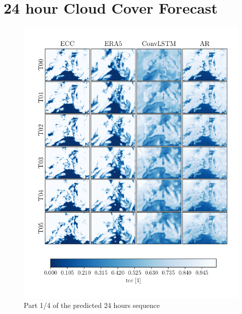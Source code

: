 \cleardoublepage
\chapter{24 hour Cloud Cover Forecast} \label{app:pred_sequence}
\begin{figure}
    \centering
    \includegraphics[scale=0.9]{python_figs/comparting_seq_part_1_of4.png}
    \caption{Part 1/4 of the predicted 24 hours sequence }
    \label{fig:part1/4}
\end{figure}
